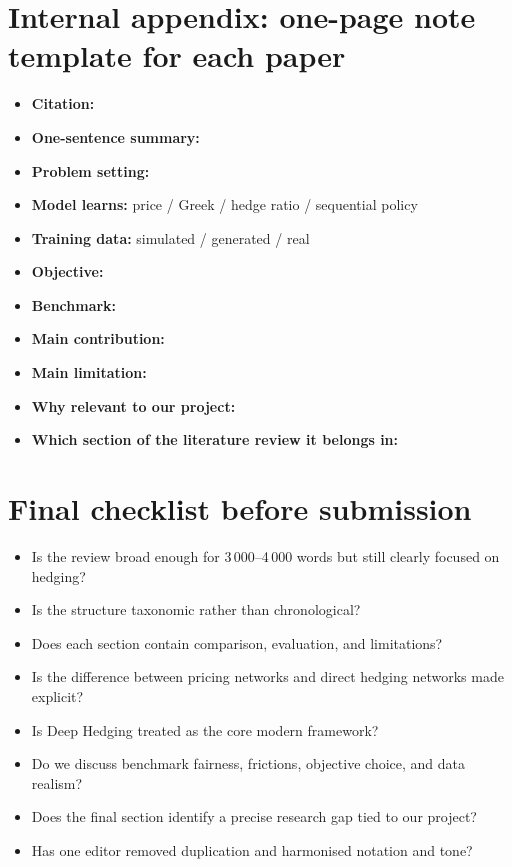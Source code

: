 \documentclass[12pt, a4paper]{article}
\begin{document}
\section*{Internal appendix: one-page note template for each paper}

\begin{itemize}
    \item \textbf{Citation:}
    \item \textbf{One-sentence summary:}
    \item \textbf{Problem setting:}
    \item \textbf{Model learns:} price / Greek / hedge ratio / sequential policy
    \item \textbf{Training data:} simulated / generated / real
    \item \textbf{Objective:}
    \item \textbf{Benchmark:}
    \item \textbf{Main contribution:}
    \item \textbf{Main limitation:}
    \item \textbf{Why relevant to our project:}
    \item \textbf{Which section of the literature review it belongs in:}
\end{itemize}


\section*{Final checklist before submission}
\begin{itemize}
    \item Is the review broad enough for 3\,000--4\,000 words but still clearly
          focused on hedging?
    \item Is the structure taxonomic rather than chronological?
    \item Does each section contain comparison, evaluation, and limitations?
    \item Is the difference between pricing networks and direct hedging networks made
          explicit?
    \item Is Deep Hedging treated as the core modern framework?
    \item Do we discuss benchmark fairness, frictions, objective choice, and data
          realism?
    \item Does the final section identify a precise research gap tied to our project?
    \item Has one editor removed duplication and harmonised notation and tone?
\end{itemize}

\newpage

\end{document}
